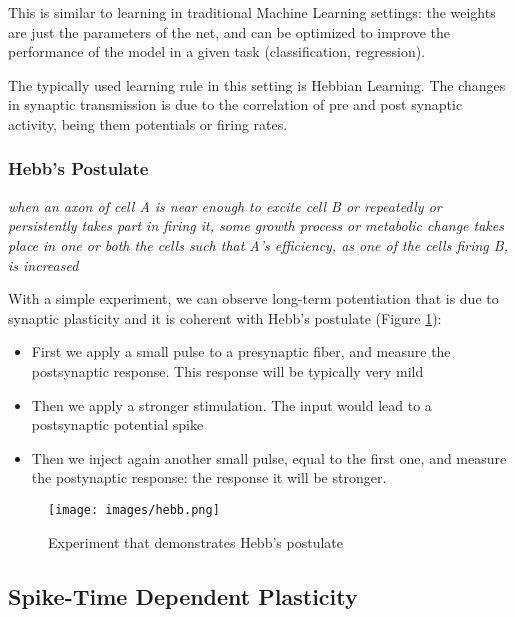 \documentclass[oneside]{book}
\theoremstyle{definition}
\theoremstyle{plain}
\begin{document}
This is similar to learning in traditional Machine Learning settings: the weights are just the parameters of the net, and can be optimized to improve the performance of the model in a given task (classification, regression).

The typically used learning rule in this setting is Hebbian Learning. The changes in synaptic transmission is due to the correlation of pre and post synaptic activity, being them potentials or firing rates.

\subsubsection*{Hebb's Postulate}
\textit{when an axon of cell A is near enough to excite cell
B or repeatedly or persistently takes part in firing it,
some growth process or metabolic change takes
place in one or both the cells such that A’s efficiency,
as one of the cells firing B, is increased}

With a simple experiment, we can observe long-term potentiation that is due to synaptic plasticity and it is coherent with Hebb's postulate (Figure \ref{fig:hebb-experiment}):
\begin{itemize}
    \item First we apply a small pulse to a presynaptic fiber, and measure the postsynaptic response. This response will be typically very mild
    \item Then we apply a stronger stimulation. The input would lead to a postsynaptic potential spike
    \item Then we inject again another small pulse, equal to the first one, and measure the postynaptic response: the response it will be stronger.
\end{itemize}
\begin{figure}
    \centering
    \texttt{[image: images/hebb.png]}
    \caption{Experiment that demonstrates Hebb's postulate}
    \label{fig:hebb-experiment}
\end{figure}

\subsection{Spike-Time Dependent Plasticity }
\end{document}
